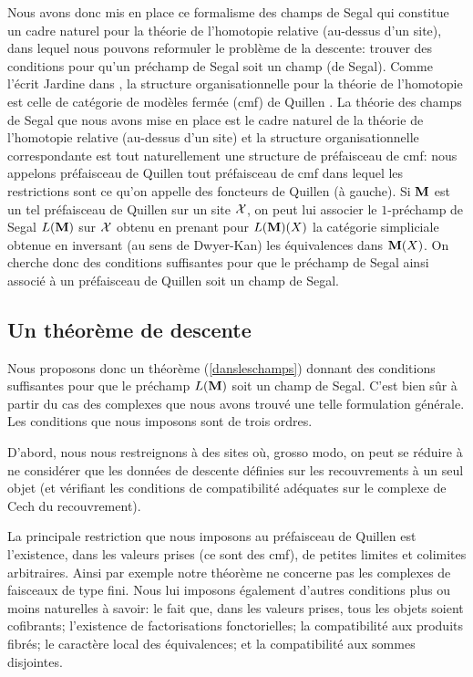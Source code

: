 \documentclass[12pt]{article}
\newcommand{\subnumero}[1]{\subsection*{#1}\phantomsection\addcontentsline{toc}{subsection}{#1}}
\newcommand{\Xx}{{\cal X}}
\begin{document}
Nous avons donc mis en place ce formalisme des champs de Segal qui
constitue un cadre naturel pour la
th\'eorie de l'homotopie relative (au-dessus d'un site), dans lequel nous
pouvons reformuler le probl\`eme de la descente: trouver des conditions
pour qu'un pr\'echamp de Segal soit un champ (de Segal).
Comme l'\'ecrit Jardine dans \cite{Jardine}, la structure organisationnelle
pour la th\'eorie de l'homotopie est celle de cat\'egorie de
mod\`eles ferm\'ee (cmf) de Quillen \cite{Quillen}. La th\'eorie des champs
de Segal que nous avons mise en place est le cadre naturel de la
th\'eorie de l'homotopie relative (au-dessus d'un site) et la structure
organisationnelle correspondante est tout naturellement une structure de
pr\'efaisceau de cmf: nous appelons pr\'efaisceau de Quillen tout
pr\'efaisceau de cmf dans lequel les restrictions sont
ce qu'on appelle des foncteurs de
Quillen (\`a gauche). Si ${\bf M}$ est un tel pr\'efaisceau de Quillen sur
un site $\Xx$, on peut lui associer le $1$-pr\'echamp de Segal
$L({\bf M})$ sur $\Xx$ obtenu en prenant pour $L({\bf M})(X)$ la cat\'egorie
simpliciale obtenue en inversant (au sens de Dwyer-Kan) les
\'equivalences  dans ${\bf M}(X)$. On cherche donc des conditions
suffisantes
pour que le pr\'echamp de Segal ainsi associ\'e \`a un pr\'efaisceau de
Quillen soit un champ de Segal.


\subnumero {Un th\'eor\`eme de descente}

Nous proposons donc un th\'eor\`eme (\ref {dansleschamps}) donnant
des conditions suffisantes  pour que le pr\'echamp $L({\bf M})$
soit un champ de Segal. C'est bien s\^ur \`a partir du cas des complexes
que nous avons trouv\'e une telle formulation g\'en\'erale.
Les conditions que nous imposons sont de trois ordres.

D'abord, nous nous restreignons \`a des sites o\`u, grosso modo,
on peut se r\'eduire \`a ne consid\'erer que les donn\'ees de descente
d\'efinies sur les recouvrements \`a un seul objet (et v\'erifiant
les conditions de compatibilit\'e ad\'equates sur le complexe de
Cech du recouvrement).

La principale restriction que
nous imposons au pr\'efaisceau de Quillen est l'existence,
dans les valeurs prises (ce sont des cmf), de petites limites et
colimites arbitraires. Ainsi par exemple notre th\'eor\`eme ne concerne
pas les complexes de faisceaux de type fini.
Nous lui imposons
\'egalement d'autres conditions plus ou moins
naturelles \`a savoir: le fait que, dans les valeurs prises,
tous les objets soient cofibrants; l'existence de factorisations
fonctorielles;
la compatibilit\'e aux produits fibr\'es; le
caract\`ere local des \'equivalences; et la compatibilit\'e aux sommes
disjointes.
\end{document}

